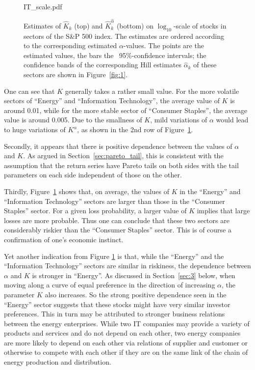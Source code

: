 \begin{figure}[htb!]
\begin{minipage}{0.33\linewidth}
    {IT_scale.pdf}
  \end{minipage}
  \caption{\small Estimates of $\hat K_k$ (top) and $\hat K_k^{\hat
      \alpha}$ (bottom) on $\log_{10}$-scale of stocks in sectors
    of the S\&P 500 index. The estimates are ordered according to the 
    corresponding estimated $\alpha$-values.
    The points are the estimated values, the bars 
    the \asy\ 95\%-confidence intervals; the confidence bands of the
    corresponding Hill estimates $\hat \alpha_k$ of these sectors are
    shown in Figure~\ref{fig:1}. 
  }
  \label{fig:sectors_parameters}
\end{figure}
One can see that $K$ generally takes a rather small value. For the
more volatile sectors of ``Energy'' and ``Information Technology'',
the average value of $K$ is around 0.01, while for the more stable
sector of ``Consumer Staples'', the average value is around 0.005. Due
to the smallness of $K$, mild variations of $\alpha$ would lead to
huge variations of $K^\alpha$, as shown in the 2nd row of
Figure~\ref{fig:sectors_parameters}.
\par
Secondly, it appears that there is positive dependence between the
values of $\alpha$ and $K$.
As argued in Section~\ref{sec:pareto_tail}, this is consistent with
the assumption that the return series have Pareto tails on both sides
with the tail parameters on each side independent of those on the
other.

\par
Thirdly, Figure~\ref{fig:sectors_parameters} shows that, on
average, the values of $K$
in the ``Energy'' and ``Information Technology'' sectors are  larger
than those in the ``Consumer Staples'' sector.  For a given loss probability, 
a larger value of $K$ implies that large losses are more
probable. Thus one can conclude that these two sectors are
considerably riskier than the ``Consumer Staples'' sector. This is of
course a confirmation of one's economic instinct.

Yet another indication from Figure \ref{fig:sectors_parameters} is
that, while the ``Energy'' and the ``Information Technology'' sectors
are similar in riskiness, the dependence  between $\alpha$ and $K$ is
stronger in ``Energy''. As discussed in Section~\ref{sec:3} below, when moving along
a curve of equal preference in the direction of increasing $\alpha$, the parameter $K$ also
increases. So the strong positive dependence seen in the ``Energy''
sector suggests that these stocks might have very similar investor
preferences. This in turn may be attributed to stronger business
relations between the energy enterprises. While two IT companies
may provide a variety of products and services and do not depend on each
other, two energy companies are more likely to depend on each other
via relations of supplier and customer or otherwise to compete with each
other if they are on the same link of the chain of energy production
and distribution.


